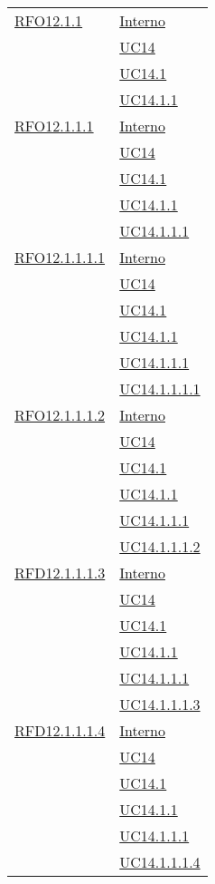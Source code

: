 \begin{longtable}{|>{\centering}m{5cm}|m{5cm}<{\centering}|}
 \hyperlink{RFO12.1.1}{RFO12.1.1} 
 & \hyperlink{Interno}{Interno}\\
& \hyperref[UC14]{UC14}\\
& \hyperref[UC14.1]{UC14.1}\\
& \hyperref[UC14.1.1]{UC14.1.1}\\\hline

 \hyperlink{RFO12.1.1.1}{RFO12.1.1.1} 
 & \hyperlink{Interno}{Interno}\\
& \hyperref[UC14]{UC14}\\
& \hyperref[UC14.1]{UC14.1}\\
& \hyperref[UC14.1.1]{UC14.1.1}\\
& \hyperref[UC14.1.1.1]{UC14.1.1.1}\\\hline

 \hyperlink{RFO12.1.1.1.1}{RFO12.1.1.1.1} 
 & \hyperlink{Interno}{Interno}\\
& \hyperref[UC14]{UC14}\\
& \hyperref[UC14.1]{UC14.1}\\
& \hyperref[UC14.1.1]{UC14.1.1}\\
& \hyperref[UC14.1.1.1]{UC14.1.1.1}\\
& \hyperref[UC14.1.1.1.1]{UC14.1.1.1.1}\\\hline

 \hyperlink{RFO12.1.1.1.2}{RFO12.1.1.1.2} 
 & \hyperlink{Interno}{Interno}\\
& \hyperref[UC14]{UC14}\\
& \hyperref[UC14.1]{UC14.1}\\
& \hyperref[UC14.1.1]{UC14.1.1}\\
& \hyperref[UC14.1.1.1]{UC14.1.1.1}\\
& \hyperref[UC14.1.1.1.2]{UC14.1.1.1.2}\\\hline

 \hyperlink{RFD12.1.1.1.3}{RFD12.1.1.1.3} 
 & \hyperlink{Interno}{Interno}\\
& \hyperref[UC14]{UC14}\\
& \hyperref[UC14.1]{UC14.1}\\
& \hyperref[UC14.1.1]{UC14.1.1}\\
& \hyperref[UC14.1.1.1]{UC14.1.1.1}\\
& \hyperref[UC14.1.1.1.3]{UC14.1.1.1.3}\\\hline

 \hyperlink{RFD12.1.1.1.4}{RFD12.1.1.1.4} 
 & \hyperlink{Interno}{Interno}\\
& \hyperref[UC14]{UC14}\\
& \hyperref[UC14.1]{UC14.1}\\
& \hyperref[UC14.1.1]{UC14.1.1}\\
& \hyperref[UC14.1.1.1]{UC14.1.1.1}\\
& \hyperref[UC14.1.1.1.4]{UC14.1.1.1.4}\\\hline


\end{longtable}
